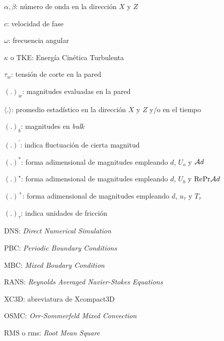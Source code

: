 \documentclass[12pt,screen,twoside]{ibtesis}
\begin{document}
\begin{preliminary}
\begin{abreviaturas}
\begin{itemize}
{{\item[] $\alpha,\beta$: número de onda en la dirección $X$ y $Z$ 
\item[] $c$: velocidad de fase
\item[] $\omega$: frecuencia angular

\item[] $\kappa$ o TKE: Energía Cinética Turbulenta

\item[] $\tau_w$: tensión de corte en la pared 

\item[] $(\text{.})_w$: magnitudes evaluadas en la pared
\item[] $\langle \text{.} \rangle$: promedio estadístico en la dirección $X$ y $Z$ y/o en el tiempo
\item[] $(\text{.})_b$: magnitudes en \textit{bulk}
\item[] $(\text{.})^{\prime}$: indica fluctuación de cierta magnitud

\item[] $(\text{.})^{*}$: forma adimensional de magnitudes empleando $d$, $U_o$ y $\mathcal{A} \hspace{0.1mm} d$ 
\item[] $(\text{.})^{\star}$: forma adimensional de magnitudes empleando $d$, $U_b$ y $\text{Re} \hspace{0.1mm} \text{Pr} \hspace{0.1mm} \mathcal{A} \hspace{0.1mm} d $ 
\item[] $(\text{.})^{+}$: forma adimensional de magnitudes empleando $d$, $u_{\tau}$ y $T_{\tau}$
\item[] $(\text{.})_{\tau}$: indica unidades de fricción




\item[] DNS: \textit{Direct Numerical Simulation}
\item[] PBC: \textit{Periodic Boundary Conditions} 
\item[] MBC: \textit{Mixed Boudary Condition}
\item[] RANS: \textit{Reynolds Averaged Navier-Stokes Equations}
\item[] XC3D: abreviatura de Xcompact3D
\item[] OSMC: \textit{Orr-Sommerfeld Mixed Convection}
\item[] RMS o rms: \textit{Root Mean Square}

}}
\end{itemize}
\end{abreviaturas}
\end{preliminary}
\end{document}
